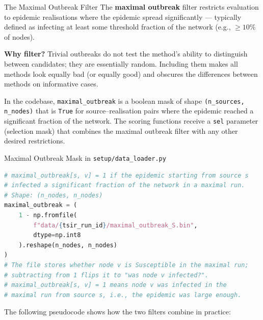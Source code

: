 \begin{conceptbox}{The Maximal Outbreak Filter}
The \textbf{maximal outbreak} filter restricts evaluation to epidemic
realisations where the epidemic spread significantly — typically defined as
infecting at least some threshold fraction of the network (e.g., $\geq 10\%$
of nodes).

\textbf{Why filter?} Trivial outbreaks do not test the method's ability to
distinguish between candidates; they are essentially random. Including them
makes all methods look equally bad (or equally good) and obscures the
differences between methods on informative cases.

In the codebase, \texttt{maximal\_outbreak} is a boolean mask of shape
\texttt{(n\_sources, n\_nodes)} that is \texttt{True} for
source--realisation pairs where the epidemic reached a significant fraction
of the network. The scoring functions receive a \texttt{sel} parameter
(selection mask) that combines the maximal outbreak filter with any other
desired restrictions.
\end{conceptbox}

\begin{codewalk}{Maximal Outbreak Mask in \texttt{setup/data\_loader.py}}
\begin{lstlisting}[language=Python]
# maximal_outbreak[s, v] = 1 if the epidemic starting from source s
# infected a significant fraction of the network in a maximal run.
# Shape: (n_nodes, n_nodes)
maximal_outbreak = (
    1 - np.fromfile(
        f"data/{tsir_run_id}/maximal_outbreak_S.bin",
        dtype=np.int8
    ).reshape(n_nodes, n_nodes)
)
# The file stores whether node v is Susceptible in the maximal run;
# subtracting from 1 flips it to "was node v infected?".
# maximal_outbreak[s, v] = 1 means node v was infected in the
# maximal run from source s, i.e., the epidemic was large enough.
\end{lstlisting}
\end{codewalk}

The following pseudocode shows how the two filters combine in practice:

